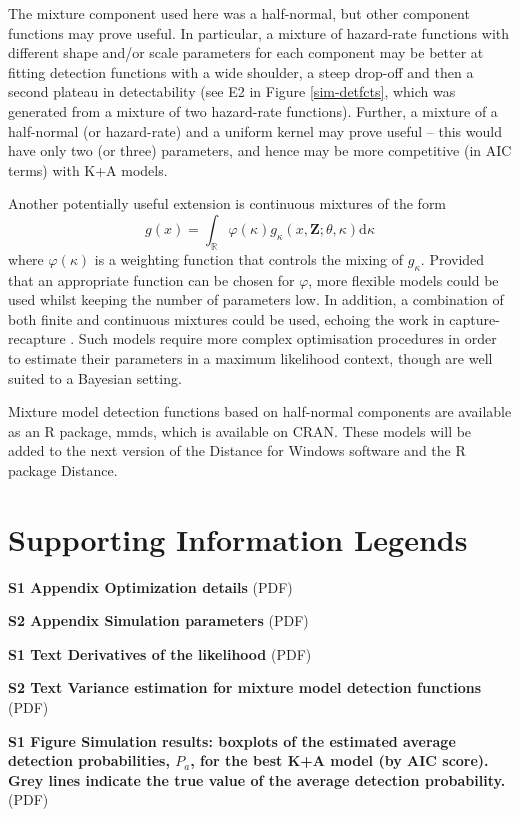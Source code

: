 \documentclass[10pt]{article}
\begin{document}
The mixture component used here was a half-normal, but other component functions may prove useful.  In particular, a mixture of hazard-rate functions with different shape and/or scale parameters for each component may be better at fitting detection functions with a wide shoulder, a steep drop-off and then a second plateau in detectability (see E2 in Figure \ref{sim-detfcts}, which was generated from a mixture of two hazard-rate functions).  Further, a mixture of a half-normal (or hazard-rate) and a uniform kernel may prove useful -- this would have only two (or three) parameters, and hence may be more competitive (in AIC terms) with K+A models.

Another potentially useful extension is continuous mixtures of the form
\begin{equation*}
g(x) = \int_\mathbb{R} \varphi(\kappa) g_\kappa(x,\mathbf{Z}; \theta, \kappa) \text{d}\kappa
\end{equation*}
where $\varphi(\kappa)$ is a weighting function that controls the mixing of $g_\kappa$. Provided that an appropriate function can be chosen for $\varphi$, more flexible models could be used whilst keeping the number of parameters low. In addition, a combination of both finite and continuous mixtures could be used, echoing the work in capture-recapture \cite{Morgan:2008wy}. Such models require more complex optimisation procedures in order to estimate their parameters in a maximum likelihood context, though are well suited to a Bayesian setting.

Mixture model detection functions based on half-normal components are available as an R package, mmds, which is available on CRAN. These models will be added to the next version of the Distance for Windows software and the R package Distance.

\section*{Supporting Information Legends}

\textbf{S1 Appendix Optimization details} (PDF)

\textbf{S2 Appendix Simulation parameters} (PDF)

\textbf{S1 Text Derivatives of the likelihood} (PDF)

\textbf{S2 Text Variance estimation for mixture model detection functions} (PDF)

\textbf{S1 Figure Simulation results: boxplots of the estimated average detection probabilities, $P_a$, for the best K+A model (by AIC score). Grey lines indicate the true value of the average detection probability.} (PDF)
\end{document}
